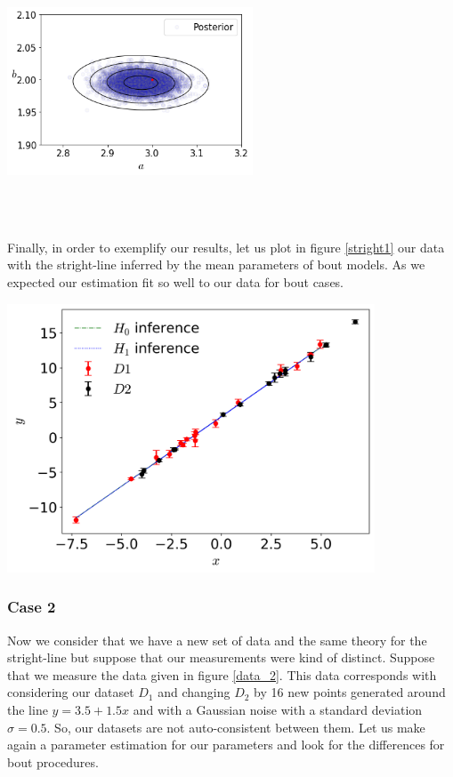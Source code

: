\documentclass[onecolumn,           %
               showpacs,            %
               preprintnumbers,     %
               aps,                 %
               prl,          	    %
               letterpaper,             %
               superscriptaddress,      %
               nofootinbib,         %
               tightenlines,        %
               floats,floatfix      %
               ,usenatbib,
               ]{revtex4-1}
\begin{document}
\begin{minipage}{\textwidth}
\centering
\includegraphics[height=5cm]{Figures/contour_2.png}
\label{contour_2}
\end{minipage}\\ $ $

Finally, in order to exemplify our results, let us plot in figure \ref{stright1} our data with the stright-line inferred by the mean parameters of bout models. As we expected our estimation fit so well  to our data for bout cases.  

\begin{minipage}{\textwidth}
\centering
\includegraphics[height=8cm]{Figures/stright1.png}
\label{stright1}
\end{minipage}

\subsubsection{Case 2}

Now we consider that we have a new set of data and the same theory for the stright-line but suppose that our measurements were kind of distinct. Suppose that we measure the data given in  figure \ref{data_2}. This data corresponds with considering our dataset $D_1$ and changing $D_2$ by 16 new points generated around the line $y=3.5+1.5x$ and with a Gaussian noise with a standard deviation $\sigma = 0.5$. So, our datasets are not auto-consistent between them. Let us make again a parameter estimation for our parameters and look for the differences for bout procedures.
\end{document}
